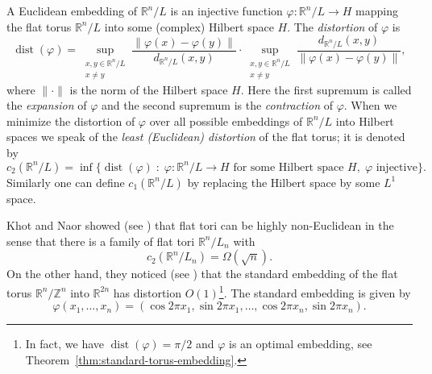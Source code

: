 \documentclass{amsart}
\newcommand{\R}{\mathbb{R}}
\newcommand{\Z}{\mathbb{Z}}
\DeclareMathOperator{\dist}{dist}
\begin{document}
A Euclidean embedding of $\R^n / L$ is an injective function
$\varphi \colon \R^n / L \to H$ mapping the flat torus $\R^n / L$ into
some (complex) Hilbert space $H$. The \emph{distortion} of $\varphi$ is
\[
  \dist(\varphi) =
  \sup_{\substack{x,y \in \R^n / L \\  x \neq y}} \frac{\|\varphi(x) - \varphi(y)\|}{d_{\R^n/L}(x,y)}
  \cdot \sup_{\substack{x,y \in \R^n / L \\  x \neq y}} \frac{d_{\R^n/L}(x,y)}{\|\varphi(x) - \varphi(y)\|},
\]
where $\| \cdot \|$ is the norm of the Hilbert space $H$.  Here the
first supremum is called the \emph{expansion} of $\varphi$ and the second
supremum is the \emph{contraction} of $\varphi$. When we minimize the
distortion of $\varphi$ over all possible embeddings of $\R^n / L$
into Hilbert spaces we speak of the \emph{least (Euclidean) distortion} of the
flat torus; it is denoted by
 \[
   c_2(\R^n / L) = \inf\{\dist(\varphi) \; : \; \varphi \colon \R^n /
   L \to H \text{ for some Hilbert space } H, \; \varphi \text{ injective}\}.
 \]
Similarly one can define $c_1(\R^n / L)$ by replacing the Hilbert space
by some $L^1$ space.

Khot and Naor showed (see \cite[Corollary 4]{Khot2006a}) that flat
tori can be highly non-Euclidean in the sense that there is a family
of flat tori $\R^n / L_n$ with
\begin{equation} \label{eq:non-Euclidean}
  c_2(\R^n / L_n) = \Omega(\sqrt{n}).
\end{equation}
On the other hand, they noticed (see \cite[Remark 5]{Khot2006a}) that
the standard embedding of the flat torus $\R^n / \Z^n$ into $\R^{2n}$ has distortion $O(1)$\footnote{In fact, we have $ \dist(\varphi) = \pi/2  $ and $ \varphi  $ is an optimal embedding, see Theorem~\ref{thm:standard-torus-embedding}.}. The standard embedding is given
by
\begin{equation}
  \label{eq:standard-embedding}
  \varphi(x_1, \ldots, x_n) = (\cos 2\pi x_1, \sin 2\pi x_1, \ldots,
  \cos 2\pi x_n, \sin 2\pi x_n).
\end{equation}
\end{document}
